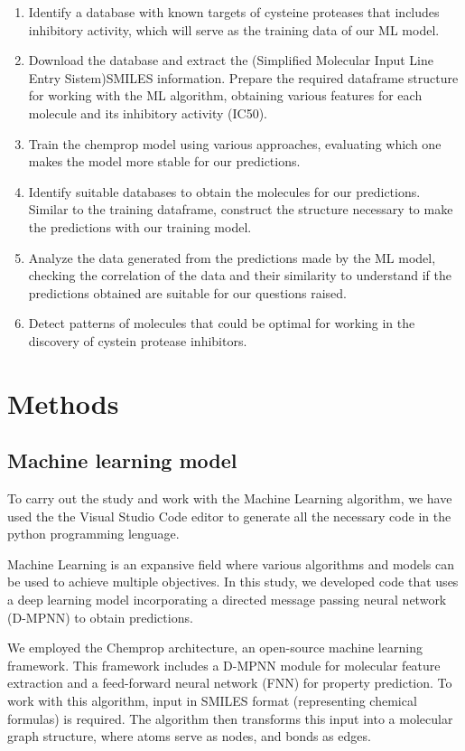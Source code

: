 \documentclass[final,times,twocolumn,article]{elsarticle}
\begin{document}
\begin{enumerate}
    \item Identify a database with known targets of cysteine proteases that includes inhibitory activity, which will serve as the training data of our ML model. 
    \item Download the database and extract the (Simplified Molecular Input Line Entry Sistem)SMILES information. Prepare the required dataframe structure for working with the ML algorithm, obtaining various features for each molecule and its inhibitory activity (IC50).
    \item Train the chemprop model using various approaches, evaluating which one makes the model more stable for our predictions. 
    \item Identify suitable databases to obtain the molecules for our predictions. Similar to the training dataframe, construct the structure necessary to make the predictions with our training model. 
    \item Analyze the data generated from the predictions made by the ML model, checking the correlation of the data and their similarity to understand if the predictions obtained are suitable for our questions raised. 
    \item Detect patterns of molecules that could be optimal for working in the discovery of cystein protease inhibitors. 
\end{enumerate}

\section{Methods}

\subsection{Machine learning model}

To carry out the study and work with the Machine Learning algorithm, we have used the the Visual Studio Code editor to generate all the necessary code in the python programming lenguage. 

Machine Learning is an expansive field where various algorithms and models can be used to achieve multiple objectives. In this study, we developed code that uses a deep learning model incorporating a directed message passing neural network (D-MPNN) to obtain predictions. 

We employed the Chemprop architecture, an open-source machine learning framework. This framework includes a D-MPNN module for molecular feature extraction and a feed-forward neural network (FNN) for property prediction. To work with this algorithm, input in SMILES format (representing chemical formulas) is required. The algorithm then transforms this input into a molecular graph structure, where atoms serve as nodes, and bonds as edges. 
\end{document}
